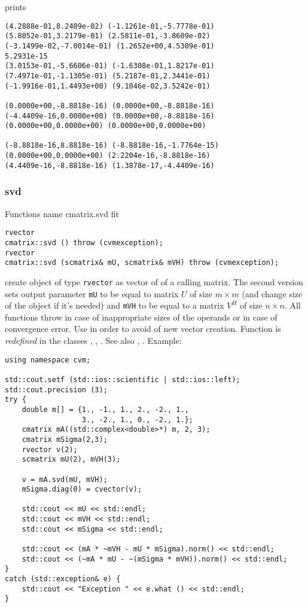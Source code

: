 prints
\begin{Verbatim}
(4.2888e-01,8.2409e-02) (-1.1261e-01,-5.7778e-01)
(5.8052e-01,3.2179e-01) (2.5811e-01,-3.8609e-02)
(-3.1499e-02,-7.0014e-01) (1.2652e+00,4.5309e-01)
5.2931e-15
(3.0153e-01,-5.6606e-01) (-1.6308e-01,1.8217e-01)
(7.4971e-01,-1.1305e-01) (5.2187e-01,2.3441e-01)
(-1.9916e-01,1.4493e+00) (9.1046e-02,3.5242e-01)

(0.0000e+00,-8.8818e-16) (0.0000e+00,-8.8818e-16)
(-4.4409e-16,0.0000e+00) (0.0000e+00,-8.8818e-16)
(0.0000e+00,0.0000e+00) (0.0000e+00,0.0000e+00)

(-8.8818e-16,8.8818e-16) (-8.8818e-16,-1.7764e-15)
(0.0000e+00,0.0000e+00) (2.2204e-16,-8.8818e-16)
(4.4409e-16,-8.8818e-16) (1.3878e-17,-4.4409e-16)
\end{Verbatim}
\newpage


\subsubsection{svd}
Functions%
\pdfdest name {cmatrix.svd} fit
\begin{verbatim}
rvector
cmatrix::svd () throw (cvmexception);
rvector
cmatrix::svd (scmatrix& mU, scmatrix& mVH) throw (cvmexception);
\end{verbatim}
create  object of type \verb"rvector"
as  vector of
 of a calling matrix.
The second version 
sets output parameter \verb"mU" to be equal
to  matrix
$U$ of size $m\times m$ (and change
 size of the object if it's needed) and
\verb"mVH" to be equal
to a matrix $V^H$ of size $n\times n$.
All  functions throw
in case of inappropriate sizes of the operands
or in case of convergence error.
Use  in order to avoid of
 new vector creation.
Function is \emph{redefined} in the  classes
, ,
.
See also
,
.
Example:
\begin{Verbatim}
using namespace cvm;

std::cout.setf (std::ios::scientific | std::ios::left); 
std::cout.precision (3);
try {
    double m[] = {1., -1., 1., 2., -2., 1.,
                  3., -2., 1., 0., -2., 1.};
    cmatrix mA((std::complex<double>*) m, 2, 3);
    cmatrix mSigma(2,3);
    rvector v(2);
    scmatrix mU(2), mVH(3);

    v = mA.svd(mU, mVH);
    mSigma.diag(0) = cvector(v);

    std::cout << mU << std::endl;
    std::cout << mVH << std::endl;
    std::cout << mSigma << std::endl;

    std::cout << (mA * ~mVH - mU * mSigma).norm() << std::endl;
    std::cout << (~mA * mU - ~(mSigma * mVH)).norm() << std::endl;
}
catch (std::exception& e) {
    std::cout << "Exception " << e.what () << std::endl;
}
\end{Verbatim}
